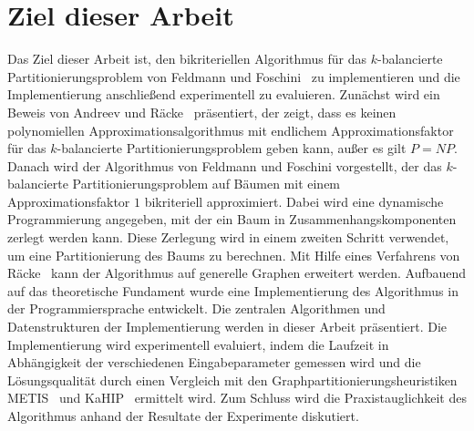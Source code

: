\section{Ziel dieser Arbeit}
Das Ziel dieser Arbeit ist, den bikriteriellen Algorithmus für das $k$\hyp balancierte Partitionierungsproblem von Feldmann und Foschini~\cite{FF15} zu implementieren und die Implementierung anschließend experimentell zu evaluieren.
Zunächst wird ein Beweis von Andreev und Räcke~\cite{ar06} präsentiert, der zeigt, dass es keinen polynomiellen Approximationsalgorithmus mit endlichem Approximationsfaktor für das $k$\hyp balancierte Partitionierungsproblem geben kann, außer es gilt $P=NP$.
Danach wird der Algorithmus von Feldmann und Foschini vorgestellt, der das $k$\hyp balancierte Partitionierungsproblem auf Bäumen mit einem Approximationsfaktor $1$ bikriteriell approximiert. 
Dabei wird eine dynamische Programmierung angegeben, mit der ein Baum in Zusammenhangskomponenten zerlegt werden kann.
Diese Zerlegung wird in einem zweiten Schritt verwendet, um eine Partitionierung des Baums zu berechnen.
Mit Hilfe eines Verfahrens von Räcke~\cite{rc08} kann der Algorithmus auf generelle Graphen erweitert werden.
Aufbauend auf das theoretische Fundament wurde eine Implementierung des Algorithmus in der Programmiersprache \Cpp{} entwickelt.
Die zentralen Algorithmen und Datenstrukturen der Implementierung werden in dieser Arbeit präsentiert. 
Die Implementierung wird experimentell evaluiert, indem die Laufzeit in Abhängigkeit der verschiedenen Eingabeparameter gemessen wird und die Lösungsqualität durch einen Vergleich mit den Graphpartitionierungsheuristiken METIS~\cite{KK98} und KaHIP~\cite{SS13} ermittelt wird.
Zum Schluss wird die Praxistauglichkeit des Algorithmus anhand der Resultate der Experimente diskutiert.
